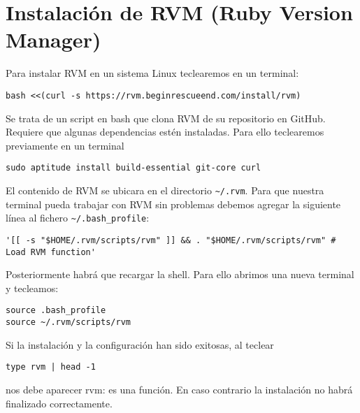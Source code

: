 
\section{Instalación de RVM (Ruby Version Manager)} %

Para instalar RVM en un sistema Linux teclearemos en un terminal: \begin{comment}\perldocf{system} \end{comment}
\begin{verbatim}
bash <<(curl -s https://rvm.beginrescueend.com/install/rvm)
\end{verbatim}
Se trata de un script en bash que clona RVM de su repositorio en GitHub.
Requiere que algunas dependencias estén instaladas. Para ello teclearemos previamente en un terminal
\begin{verbatim}
sudo aptitude install build-essential git-core curl
\end{verbatim}
El contenido de RVM se ubicara en el directorio \verb|~/.rvm|.
Para que nuestra terminal pueda trabajar con RVM sin problemas debemos agregar la siguiente línea al fichero \verb|~/.bash_profile|:
\begin{verbatim}
'[[ -s "$HOME/.rvm/scripts/rvm" ]] && . "$HOME/.rvm/scripts/rvm" # Load RVM function'
\end{verbatim}
Posteriormente habrá que recargar la shell. Para ello abrimos una nueva terminal y tecleamos:
\begin{verbatim}
source .bash_profile
source ~/.rvm/scripts/rvm
\end{verbatim}
Si la instalación y la configuración han sido exitosas, al teclear 
\begin{verbatim}
type rvm | head -1
\end{verbatim}
nos debe aparecer rvm: es una función. En caso contrario la instalación no habrá finalizado correctamente.
